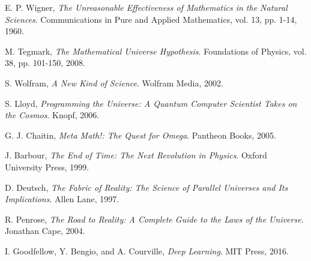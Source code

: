 \documentclass[12pt]{article}
\begin{document}
\begin{thebibliography}{9}

E. P. Wigner,
\emph{The Unreasonable Effectiveness of Mathematics in the Natural Sciences}.
Communications in Pure and Applied Mathematics, vol. 13, pp. 1-14, 1960.

M. Tegmark,
\emph{The Mathematical Universe Hypothesis}.
Foundations of Physics, vol. 38, pp. 101-150, 2008.

S. Wolfram,
\emph{A New Kind of Science}.
Wolfram Media, 2002.

S. Lloyd,
\emph{Programming the Universe: A Quantum Computer Scientist Takes on the Cosmos}.
Knopf, 2006.

G. J. Chaitin,
\emph{Meta Math!: The Quest for Omega}.
Pantheon Books, 2005.

J. Barbour,
\emph{The End of Time: The Next Revolution in Physics}.
Oxford University Press, 1999.

D. Deutsch,
\emph{The Fabric of Reality: The Science of Parallel Universes and Its Implications}.
Allen Lane, 1997.

R. Penrose,
\emph{The Road to Reality: A Complete Guide to the Laws of the Universe}.
Jonathan Cape, 2004.

I. Goodfellow, Y. Bengio, and A. Courville,
\emph{Deep Learning}.
MIT Press, 2016.

\end{thebibliography}
\end{document}
